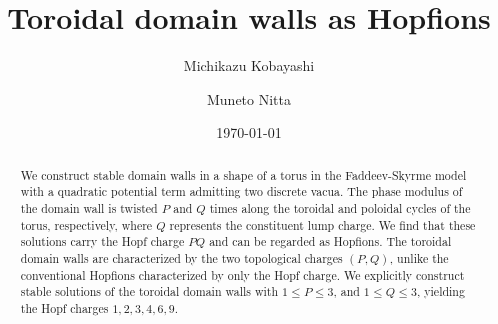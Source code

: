 \documentclass[aps,prd,preprint,
superscriptaddress]{revtex4}
\newcommand {\1}[1]{\frac{1}{#1}}
\newcommand {\2}[1]{\frac{i}{#1}}
\begin{document}

\title{Toroidal domain walls as Hopfions
}


\author{Michikazu Kobayashi}
\author{Muneto Nitta}




\date{\today}
\begin{abstract}
We construct stable domain walls in a shape of a torus 
in the Faddeev-Skyrme model with a quadratic potential term admitting two discrete vacua.  
The phase modulus of the domain wall is twisted 
$P$ and $Q$ times  
along the toroidal and poloidal cycles of the torus, 
respectively,
where $Q$ represents the constituent lump charge.
We find that these solutions carry the Hopf charge 
$PQ$
and can be regarded as Hopfions.
The toroidal domain walls are 
characterized by the two topological charges 
$(P,Q)$, 
unlike the conventional Hopfions characterized by 
only the Hopf charge.
We explicitly construct stable solutions of 
the toroidal domain walls 
with $1 \leq P \leq 3$, and $1 \leq Q \leq 3$, 
yielding the Hopf charges $1,2,3,4,6,9$.



\end{abstract}
\pacs{}
\end{document}
